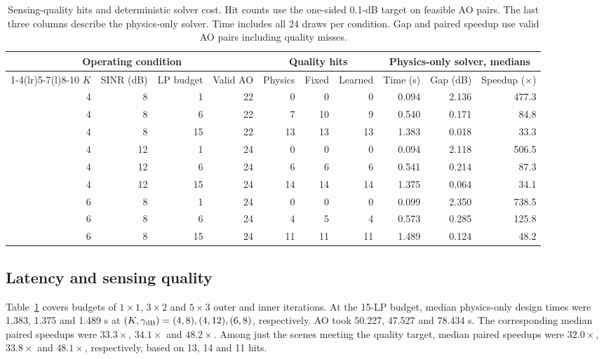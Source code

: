 \documentclass[journal]{IEEEtran}
\begin{document}
\begin{table}[t]\centering\footnotesize
\caption{Sensing-quality hits and deterministic solver cost. Hit counts use the one-sided 0.1-dB target on feasible AO pairs. The last three columns describe the physics-only solver. Time includes all 24 draws per condition. Gap and paired speedup use valid AO pairs including quality misses.}
\label{tab:mc}
\begin{tabular}{@{}rrrrrrr rrr@{}}
\toprule
\multicolumn{4}{c}{Operating condition} & \multicolumn{3}{c}{Quality hits} &
\multicolumn{3}{c}{Physics-only solver, medians}\\
\cmidrule(lr){1-4}\cmidrule(lr){5-7}\cmidrule(l){8-10}
$K$ & SINR (dB) & LP budget & Valid AO &
Physics & Fixed & Learned & Time (s) & Gap (dB) & Speedup ($\times$)\\
\midrule
4 & 8 & 1 & 22 & 0 & 0 & 0 & 0.094 & 2.136 & 477.3\\
4 & 8 & 6 & 22 & 7 & 10 & 9 & 0.540 & 0.171 & 84.8\\
4 & 8 & 15 & 22 & 13 & 13 & 13 & 1.383 & 0.018 & 33.3\\
\midrule
4 & 12 & 1 & 24 & 0 & 0 & 0 & 0.094 & 2.118 & 506.5\\
4 & 12 & 6 & 24 & 6 & 6 & 6 & 0.541 & 0.214 & 87.3\\
4 & 12 & 15 & 24 & 14 & 14 & 14 & 1.375 & 0.064 & 34.1\\
\midrule
6 & 8 & 1 & 24 & 0 & 0 & 0 & 0.099 & 2.350 & 738.5\\
6 & 8 & 6 & 24 & 4 & 5 & 4 & 0.573 & 0.285 & 125.8\\
6 & 8 & 15 & 24 & 11 & 11 & 11 & 1.489 & 0.124 & 48.2\\
\bottomrule
\end{tabular}
\end{table}

\subsection{Latency and sensing quality}
Table~\ref{tab:mc} covers budgets of $1\times1$, $3\times2$ and $5\times3$ outer and inner iterations. At the 15-LP budget, median physics-only design times were 1.383, 1.375 and 1.489 s at $(K,\gamma_{\rm dB})=(4,8),(4,12),(6,8)$, respectively. AO took 50.227, 47.527 and 78.434 s. The corresponding median paired speedups were $33.3\times$, $34.1\times$ and $48.2\times$. Among just the scenes meeting the quality target, median paired speedups were $32.0\times$, $33.8\times$ and $48.1\times$, respectively, based on 13, 14 and 11 hits.
\end{document}
